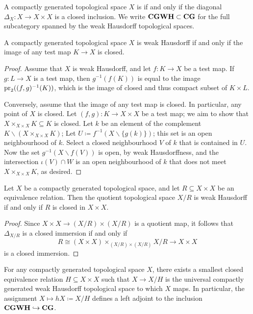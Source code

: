 \begin{dfn}
	A compactly generated topological space $ X $ is  if and only if the diagonal $ \Delta_X \colon X \to X \times X $ is a closed inclusion.
	We write $ \textbf{\textup{CGWH}} \subset \textbf{\textup{CG}} $ for the full subcategory spanned by the weak Hausdorff topological spaces.
\end{dfn}

\begin{lem}
	A compactly generated topological space $ X $ is weak Hausdorff if and only if the image of any test map $ K \to X $ is closed.
\end{lem}

\begin{proof}
	Assume that $ X $ is weak Hausdorff, and let $ f \colon K \to X $ be a test map.
	If $ g \colon L \to X $ is a test map, then $ g^{-1}(f(K)) $ is equal to the image $ \operatorname{pr}_2((f, g)^{-1}(K)) $, which is the image of closed and thus compact subset of $ K \times L $.

	Conversely, assume that the image of any test map is closed.
	In particular, any point of $ X $ is closed.
	Let $ (f, g) \colon K \to X \times X $ be a test map;
	we aim to show that $ X \times_{X \times X} K \subseteq K $ is closed.
	Let $ k $ be an element of the complement $ K \smallsetminus ( X \times_{X \times X} K ) $;
	Let $ U \coloneq f^{-1}( X \smallsetminus \{ g(k) \} ) $;
	this set is an open neighbourhood of $ k $.
	Select a closed neighbourhood $ V $ of $ k $ that is contained in $ U $.
	Now the set $ g^{-1}(X \smallsetminus f(V)) $ is open, by weak Hausdorffness, and the intersection $ \iota(V) \cap W $ is an open neighbourhood of $ k $ that does not meet $ X \times_{X \times X} K $, as desired.
\end{proof}

\begin{lem}
	Let $ X $ be a compactly generated topological space, and let $ R \subseteq X \times X $ be an equivalence relation.
	Then the quotient topological space $ X/R $ is weak Hausdorff if and only if $ R $ is closed in $ X \times X $.
\end{lem}

\begin{proof}
	Since $ X \times X \to (X/R) \times (X/R) $ is a quotient map, it follows that $ \Delta_{X/R} $ is a closed immersion if and only if
	\[
		R \cong (X \times X) \times_{(X/R) \times (X/R)} X/R \to X \times X
	\]
	is a closed immersion.
\end{proof}

\begin{cor}
	For any compactly generated topological space $ X $, there exists a smallest closed equivalence relation $ H \subseteq X \times X $ such that $ X \to X/H $ is the universal compactly generated weak Hausdorff topological space to which $ X $ maps.
	In particular, the assignment $ X \mapsto hX \coloneq X/H $ defines a left adjoint to the inclusion $ \textbf{\textup{CGWH}} \hookrightarrow \textbf{\textup{CG}} $.
\end{cor}





